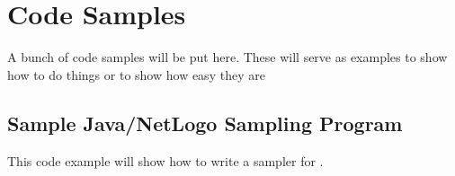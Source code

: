 \chapter{Code Samples}
\thispagestyle{plain}

\label{CodeSamples}

A bunch of code samples will be put here. These will serve as examples to show how to do things or to show how easy they are

\section{Sample Java/NetLogo Sampling Program}
\label{SamplingProgram}

This code example will show how to write a sampler for \fw.





